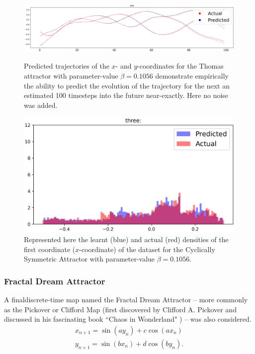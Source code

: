 \begin{figure}[ht]
  \centering
  \includegraphics[scale=0.35]{Graphs/_Thomas_1.eps}\caption*{Predicted trajectories of the $x$- and $y$-coordinates for the Thomas attractor with parameter-value $\beta=0.1056$ demonstrate empirically the ability to predict the evolution of the trajectory for the next an estimated 100 timesteps into the future near-exactly. Here no noise was added.}
  \includegraphics[scale=0.5]{Graphs/_Thomas_3.eps}\caption*{Represented here the learnt (blue) and actual (red) densities of the first coordinate ($x$-coordinate) of the dataset for the Cyclically Symmetric Attractor with parameter-value $\beta=0.1056$.}
\end{figure} \label{fig:Thomas_TrajDensity}


\subsubsection{Fractal Dream Attractor}

A finaldiscrete-time map named the Fractal Dream Attractor -- more commonly as the Pickover or Clifford Map (first discovered by Clifford A. Pickover and discussed in his fascinating book ``Chaos in Wonderland" \cite{PickoverChaos}) -- was also considered.
\begin{eqnarray}\label{eqns_clifford}
  {x_{n+1}=\sin(ay_n) + c\cos(ax_n)} \\
  {y_{n+1}=\sin(bx_n)+d\cos(by_n)}.
\end{eqnarray}


